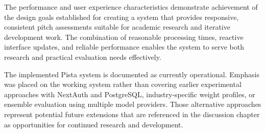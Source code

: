 The performance and user experience characteristics demonstrate achievement of the design goals established for creating a system that provides responsive, consistent pitch assessments suitable for academic research and iterative development work. The combination of reasonable processing times, reactive interface updates, and reliable performance enables the system to serve both research and practical evaluation needs effectively.

The implemented Pista system is documented as currently operational. Emphasis was placed on the working system rather than covering earlier experimental approaches with NextAuth and PostgreSQL, industry-specific weight profiles, or ensemble evaluation using multiple model providers. Those alternative approaches represent potential future extensions that are referenced in the discussion chapter as opportunities for continued research and development.
